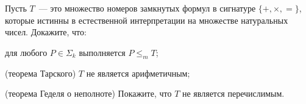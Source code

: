 Пусть $T$~--- это множество номеров замкнутых формул в сигнатуре $\{+, \times, =\}$, которые истинны в естественной
интерпретации на множестве натуральных чисел. Докажите, что:
\begin{enumcyr}
    \item для любого $P \in \Sigma_k$ выполняется $P \le_m T$;
    \item (теорема Тарского) $T$ не является арифметичным;
    \item (теорема Геделя о неполноте) Покажите, что $T$ не является перечислимым.
\end{enumcyr}